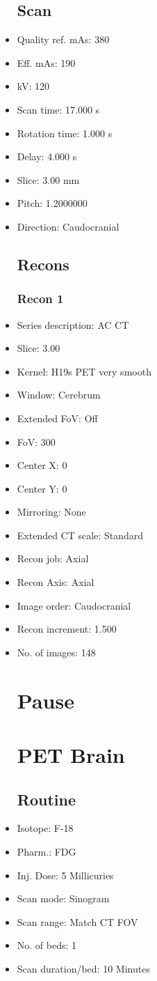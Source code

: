 \documentclass[12pt]{article}
\begin{document}
\begin{itemize}
\subsection{Scan}
\item Quality ref. mAs: 380\item Eff. mAs: 190\item kV: 120\item Scan time: 17.000 s\item Rotation time: 1.000 s\item Delay: 4.000 s\item Slice: 3.00 mm\item Pitch: 1.2000000\item Direction: Caudocranial\subsection{Recons}

\subsubsection{Recon 1}
\item Series description: AC CT
\item Slice: 3.00
\item Kernel: H19s PET very smooth
\item Window: Cerebrum
\item Extended FoV: Off
\item FoV: 300
\item Center X: 0
\item Center Y: 0
\item Mirroring: None
\item Extended CT scale: Standard
\item Recon job: Axial
\item Recon Axis: Axial
\item Image order: Caudocranial
\item Recon increment: 1.500
\item No. of images: 148
\section{Pause}
\section{PET Brain}\subsection{Routine}
\item Isotope: F-18
\item Pharm.: FDG
\item Inj. Dose: 5 Millicuries
\item Scan mode: Sinogram
\item Scan range: Match CT FOV
\item No. of beds: 1
\item Scan duration/bed: 10 Minutes

\end{itemize}
\end{document}
